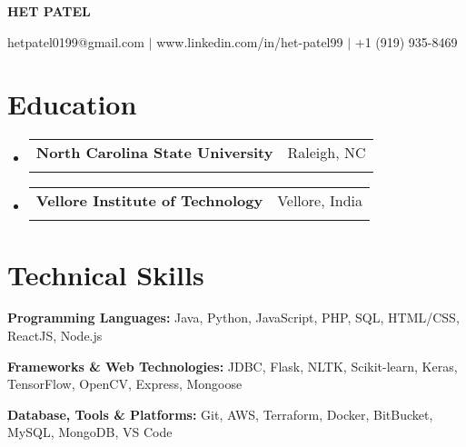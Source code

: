 \documentclass[letter,11pt]{article}
\makeatletter
\newcommand{\resumeItem}[2]{
  \vspace{-2pt}\item\small{
    \textbf{#1}{#2 \vspace{-2pt}}
  }
}
\newcommand{\resumeSubItem}[2]{
  \vspace{-2pt}\resumeItem{#1}{#2} \vspace{-2pt}}
\newcommand{\resumeSubheadingEducation}[4]{
	\item
	\begin{tabular*}{0.97\textwidth}[t]{l@{\extracolsep{\fill}}r}
		\textbf{#1} & #2 \\
		\text{\small#3} & \text{\small #4} %
	\end{tabular*}\vspace{-2pt}
}
\newcommand{\resumeSubHeadingListStartNoBul}{\vspace{-2pt}}
\newcommand{\resumeSubHeadingListEndNoBul}{}
\newcommand{\resumeSubHeadingListStart}{\begin{itemize}[leftmargin=*]}
\newcommand{\resumeSubHeadingListEnd}{\end{itemize}}
\makeatother
\begin{document}
	\centerline{\textbf{{\large HET PATEL}}}
	\centerline{}
	\centerline{{\faEnvelope\enspace hetpatel0199@gmail.com} $\vert$ {\faLinkedin\enspace www.linkedin.com/in/het-patel99} $\vert$  \faPhone\enspace +1 (919) 935-8469}


\section{\textbf{Education}}
  \resumeSubHeadingListStart
  \resumeSubheadingEducation
  {North Carolina State University}{Raleigh, NC}
  {Master of Computer Science; GPA: 4.0/4.0}{Anticipated May 2023}
  
    
  \resumeSubheadingEducation
  {Vellore Institute of Technology}{Vellore, India}
  {B. Tech in Computer Science \& Engineering; GPA: 9.06/10} {June 2017 -- May 2021}
  
  \resumeSubHeadingListEnd
  
\section{\textbf{Technical Skills}}

\resumeSubHeadingListStartNoBul
\resumeSubItem{}{\textbf{Programming Languages:} Java, Python, JavaScript, PHP, SQL, HTML/CSS, ReactJS, Node.js}
\vspace{4pt}
\resumeSubItem{}{\textbf{Frameworks \& Web Technologies:} JDBC, Flask, NLTK, Scikit-learn, Keras, TensorFlow, OpenCV, Express, Mongoose}
\vspace{4pt}
\resumeSubItem{}{\textbf{Database, Tools \& Platforms:} Git, AWS, Terraform, Docker, BitBucket, MySQL, MongoDB, VS Code}
\resumeSubHeadingListEndNoBul
\end{document}
